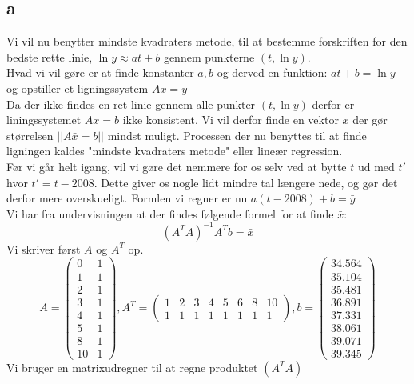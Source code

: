 \documentclass[a4paper,fleqn]{article}
\begin{document}
	\subsection{a}
	Vi vil nu benytter mindste kvadraters metode, til at bestemme forskriften for den bedste
	rette linie, $\ln y \approx at+b$ gennem punkterne $(t, \ln y)$.\\
	Hvad vi vil gøre er at finde konstanter $a,b$ og derved en funktion: $at+b=\ln y$ og
	opstiller et ligningssystem $Ax = y$\\
	Da der ikke findes en ret linie gennem alle punkter $(t, \ln y)$ derfor er liningssystemet
	$Ax = b$ ikke konsistent. Vi vil derfor finde en vektor $\bar{x}$ der gør størrelsen
	$||A\bar{x} = b||$ mindst muligt. Processen der nu benyttes til at finde ligningen kaldes
	"mindste kvadraters metode" eller lineær regression.\\
	Før vi går helt igang, vil vi gøre det nemmere for os selv ved at bytte $t$ ud med $t'$
	hvor $t' = t-2008$. Dette giver os nogle lidt mindre tal længere nede, og gør det derfor
	mere overskueligt. Formlen vi regner er nu $a(t-2008) + b = \bar{y}$\\
	Vi har fra undervisningen at der findes følgende formel for at finde $\bar{x}$:
	\[ (A^T A)^{-1} A^T b = \bar{x} \]
	Vi skriver først $A$ og $A^T$ op.
	\[A = \left(\begin{array}{rr}
		0 & 1 \\
		1 & 1 \\
		2 & 1 \\
		3 & 1 \\
		4 & 1 \\
		5 & 1 \\
		8 & 1 \\
		10 & 1
	\end{array}\right), 
	A^T =\left(\begin{array}{rrrrrrrr}
		1 & 2 & 3 & 4 & 5 & 6 & 8 & 10 \\
		1 & 1 & 1 & 1 & 1 & 1 & 1 & 1
	\end{array}\right), b = \left(\begin{array}{r}
		34.564 \\
		35.104 \\
		35.481 \\
		36.891 \\
		37.331 \\
		38.061 \\
		39.071 \\
		39.345
	\end{array}\right) \]
	Vi bruger en matrixudregner til at regne produktet $(A^TA)$
\end{document}
